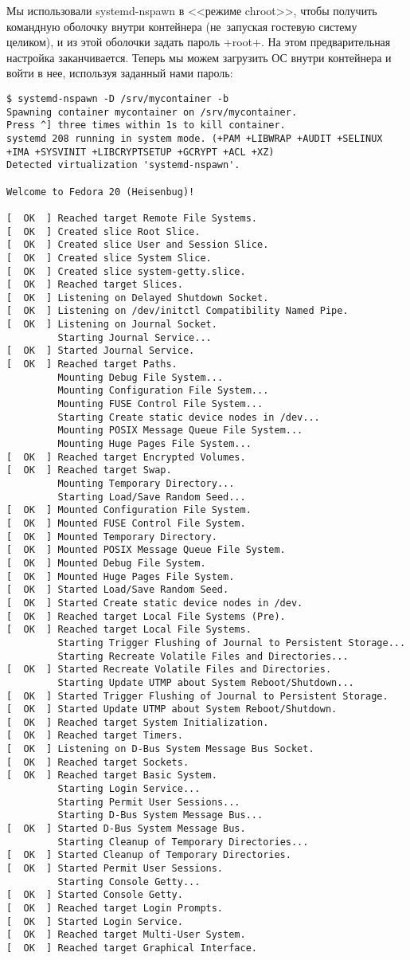 \documentclass[10pt,oneside,a4paper]{article}
\begin{document}
Мы использовали systemd-nspawn в <<режиме chroot>>, чтобы получить
командную оболочку внутри контейнера (не~запуская гостевую систему целиком), и из этой
оболочки задать пароль +root+. На этом предварительная настройка заканчивается.
Теперь мы можем загрузить ОС внутри контейнера и войти в нее, используя заданный
нами пароль:
\begin{Verbatim}[fontsize=\small]
$ systemd-nspawn -D /srv/mycontainer -b
Spawning container mycontainer on /srv/mycontainer.
Press ^] three times within 1s to kill container.
systemd 208 running in system mode. (+PAM +LIBWRAP +AUDIT +SELINUX +IMA +SYSVINIT +LIBCRYPTSETUP +GCRYPT +ACL +XZ)
Detected virtualization 'systemd-nspawn'.

Welcome to Fedora 20 (Heisenbug)!

[  OK  ] Reached target Remote File Systems.
[  OK  ] Created slice Root Slice.
[  OK  ] Created slice User and Session Slice.
[  OK  ] Created slice System Slice.
[  OK  ] Created slice system-getty.slice.
[  OK  ] Reached target Slices.
[  OK  ] Listening on Delayed Shutdown Socket.
[  OK  ] Listening on /dev/initctl Compatibility Named Pipe.
[  OK  ] Listening on Journal Socket.
         Starting Journal Service...
[  OK  ] Started Journal Service.
[  OK  ] Reached target Paths.
         Mounting Debug File System...
         Mounting Configuration File System...
         Mounting FUSE Control File System...
         Starting Create static device nodes in /dev...
         Mounting POSIX Message Queue File System...
         Mounting Huge Pages File System...
[  OK  ] Reached target Encrypted Volumes.
[  OK  ] Reached target Swap.
         Mounting Temporary Directory...
         Starting Load/Save Random Seed...
[  OK  ] Mounted Configuration File System.
[  OK  ] Mounted FUSE Control File System.
[  OK  ] Mounted Temporary Directory.
[  OK  ] Mounted POSIX Message Queue File System.
[  OK  ] Mounted Debug File System.
[  OK  ] Mounted Huge Pages File System.
[  OK  ] Started Load/Save Random Seed.
[  OK  ] Started Create static device nodes in /dev.
[  OK  ] Reached target Local File Systems (Pre).
[  OK  ] Reached target Local File Systems.
         Starting Trigger Flushing of Journal to Persistent Storage...
         Starting Recreate Volatile Files and Directories...
[  OK  ] Started Recreate Volatile Files and Directories.
         Starting Update UTMP about System Reboot/Shutdown...
[  OK  ] Started Trigger Flushing of Journal to Persistent Storage.
[  OK  ] Started Update UTMP about System Reboot/Shutdown.
[  OK  ] Reached target System Initialization.
[  OK  ] Reached target Timers.
[  OK  ] Listening on D-Bus System Message Bus Socket.
[  OK  ] Reached target Sockets.
[  OK  ] Reached target Basic System.
         Starting Login Service...
         Starting Permit User Sessions...
         Starting D-Bus System Message Bus...
[  OK  ] Started D-Bus System Message Bus.
         Starting Cleanup of Temporary Directories...
[  OK  ] Started Cleanup of Temporary Directories.
[  OK  ] Started Permit User Sessions.
         Starting Console Getty...
[  OK  ] Started Console Getty.
[  OK  ] Reached target Login Prompts.
[  OK  ] Started Login Service.
[  OK  ] Reached target Multi-User System.
[  OK  ] Reached target Graphical Interface.


\end{Verbatim}
\end{document}
